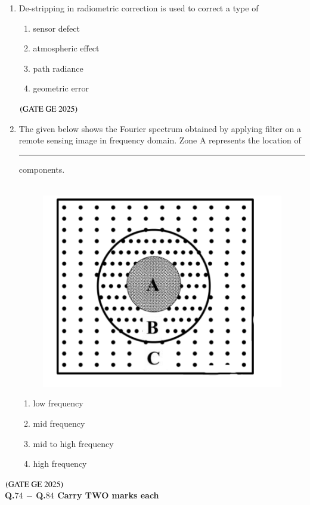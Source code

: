 \documentclass[journal,12pt,onecolumn]{IEEEtran}
\theoremstyle{remark}
\begin{document}
\begin{enumerate}
\item De-stripping in radiometric correction is used to correct a type of
\begin{enumerate}
\item sensor defect
\item atmospheric effect
\item path radiance
\item geometric error
\end{enumerate}
\hfill $\left(\text{GATE GE 2025}\right)$
\bigskip
\item The  given below shows the Fourier spectrum obtained by applying filter on a remote sensing image in frequency domain.
Zone A represents the location of \rule{2cm}{0.5mm} components. \\
\\
\begin{figure}[H]
    \centering
    \includegraphics[width=0.2\columnwidth]{figs/fig10.png}
    \caption{}
    \label{figs:fig10}
\end{figure}

\begin{enumerate}
\item low frequency
\item mid frequency
\item mid to high frequency
\item high frequency
\end{enumerate}

\end{enumerate}
\hfill $\left(\text{GATE GE 2025}\right)$
\bigskip
\\
\textbf{Q.$74$ $-$ Q.$84$ Carry TWO marks each}
\\
\end{document}
